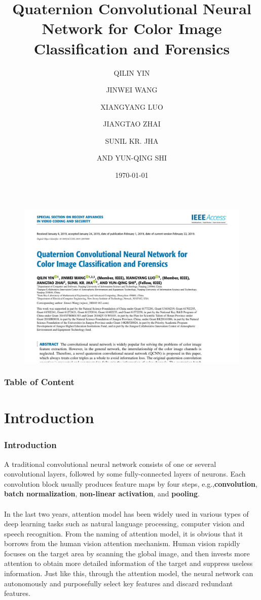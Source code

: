 \documentclass{beamer}
\title{Quaternion Convolutional Neural Network for
Color Image Classification and Forensics}
\author{QILIN YIN\and JINWEI WANG \and  XIANGYANG LUO\and JIANGTAO ZHAI \and SUNIL KR. JHA \and AND YUN-QING SHI}
\date{\today}
\begin{document}
\begin{frame}
    \titlepage
\end{frame}
\begin{frame}
    \begin{figure}[H]
        \centering
        \includegraphics[width=\textwidth]{img/1.jpg}
    \end{figure}
\end{frame}
\begin{frame}
    \frametitle{Table of Content}
    \tableofcontents
\end{frame}
\section{Introduction}
\begin{frame}
    \frametitle{Introduction}
A traditional convolutional neural network consists of one or several convolutional layers, followed by some fully-connected layers of neurons. Each convolution block usually produces feature maps by four steps, e.g.,\textbf{convolution}, \textbf{batch normalization}, \textbf{non-linear activation}, and \textbf{pooling}.
\\~\\
In the last two years, attention model has been widely used in various types of deep learning tasks such as natural language processing, computer vision and speech recognition. From the naming of attention model, it is obvious that it borrows from the human vision attention mechanism. Human vision rapidly focuses on the target area by scanning the global image, and then invests more attention to obtain more detailed information of the target and suppress useless information. Just like this, through the attention model, the neural network can autonomously and purposefully select key features and discard redundant features.
\end{frame}
\end{document}
